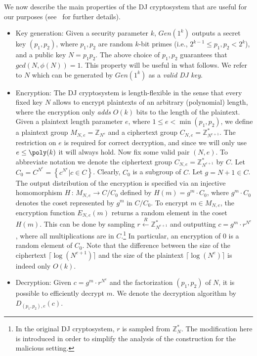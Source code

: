 \documentclass{article}
\newcommand{\gendj}{Gen}
\newcommand{\encdj}{{E}_{N,e}}
\newcommand{\decdj}{{D}_{(p_1,p_2),e}}
\newcommand{\fnrngdom}[2]{#1\to#2}
\newcommand{\fndef}[3]{{#1\,:\,\fnrngdom{#2}{#3}}}
\newcommand{\set}[1]{\left\{#1\right\}}
\newcommand{\condset}[2]{\set{#1|#2}}
\newcommand{\Z}{{\mathbb{Z}}}
\newcommand{\usamp}[2]{#1\stackrel{R}{\leftarrow}#2}
\newcommand{\U}[1]{\mathbb{Z}_{#1}^*}
\begin{document}
We now describe the main properties of the DJ cryptosystem that are
useful for our purposes (see~\cite{DJ01} for further details).
\begin{itemize}
\item{\sc Key generation:} Given a security parameter $k$,
$\gendj(1^k)$ outputs a secret key $(p_1,p_2)$, where $p_1,p_2$ are
random $k$-bit primes (i.e., $2^{k-1}\le p_1,p_2<2^k$), and a
public key $N=p_1p_2$. The above choice of $p_1,p_2$ guarantees
that $gcd(N,\phi(N))=1$. This property will be useful in what
follows. We refer to $N$ which can be generated by $\gendj(1^k)$ as
a {\em valid DJ key}.
\item{\sc Encryption:} The DJ cryptosystem is length-flexible in the
sense that every fixed key $N$ allows to encrypt plaintexts of an
arbitrary (polynomial) length, where the encryption only {\em adds}
$O(k)$ bits to the length of the plaintext. Given a plaintext
length parameter $e$, where $1\leq e<\min{(p_1,p_2)}$, we define a
plaintext group $M_{N,e}=\Z_{N^e}$ and a ciphertext group
$C_{N,e}=\U{N^{e+1}}$.  The restriction on $e$ is required for
correct decryption, and since we will only use $e\le\poly(k)$ it
will always hold.
Now fix some valid pair $(N,e)$. To abbreviate notation we denote
the ciphertext group $C_{N,e}=\U{N^{e+1}}$ by $C$. Let
$C_0=C^{N^e}=\condset{c^{N^e}}{c\in C}$. Clearly, $C_0$ is a
subgroup of $C$. Let $g=N+1\in C$. The output distribution of the
encryption is specified via an injective homomorphism
$\fndef{H}{M_{N,e}}{C/C_0}$
defined by $H(m)=g^m\cdot C_0$, where $g^m\cdot C_0$ denotes the
coset represented by $g^m$ in $C/C_0$. To encrypt $m\in M_{N,e}$,
the encryption function $\encdj(m)$ returns a random element in the
coset $H(m)$. This can be done by sampling $\usamp{r}{\U{N^{e+1}}}$
and outputting $c=g^m\cdot{r^{N^e}}$, where all multiplications are
in $C$.\footnote{In the original DJ cryptosystem, $r$ is sampled
from $\U{N}$. The modification here is introduced in order to
simplify the analysis of the construction for the malicious
setting.} In particular, an encryption of $0$ is a random element
of $C_0$. Note that the difference between the size of the
ciphertext $\lceil\log (N^{e+1})\rceil$ and the size of the
plaintext $\lceil\log (N^e)\rceil$ is indeed only $O(k)$.

\item{\sc Decryption:} Given $c=g^m\cdot{r^{N^e}}$ and the
factorization $(p_1,p_2)$ of $N$, it is possible to efficiently
decrypt $m$. We denote the decryption algorithm by $\decdj(c)$.


\end{itemize}
\end{document}
